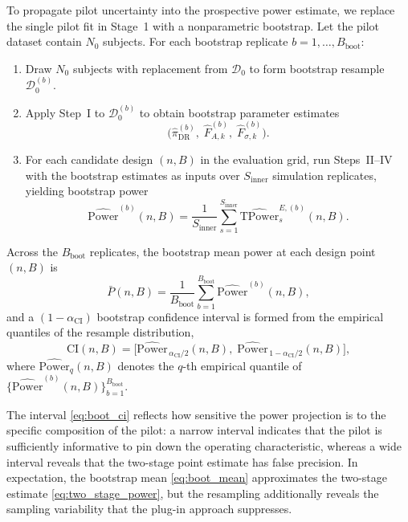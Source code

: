 \documentclass{article}
\begin{document}
To propagate pilot uncertainty into the prospective power estimate, we replace
the single pilot fit in Stage~1 with a nonparametric bootstrap. Let the pilot
dataset contain $N_0$ subjects. For each bootstrap replicate $b=1,\ldots,B_{\mathrm{boot}}$:

\begin{enumerate}
\item Draw $N_0$ subjects with replacement from $\mathcal{D}_0$ to form
bootstrap resample $\mathcal{D}_0^{(b)}$.

\item Apply Step~I to $\mathcal{D}_0^{(b)}$ to obtain bootstrap parameter
estimates
\[
\bigl(\hat{\pi}_{\mathrm{DR}}^{(b)},\;\hat{F}_{A,k}^{(b)},\;\hat{F}_{\sigma,k}^{(b)}\bigr).
\]

\item For each candidate design $(n,B)$ in the evaluation grid, run Steps~II--IV
with the bootstrap estimates as inputs over $S_{\mathrm{inner}}$ simulation
replicates, yielding bootstrap power
\begin{equation}
\widehat{\mathrm{Power}}^{(b)}(n,B)
=
\frac{1}{S_{\mathrm{inner}}}
\sum_{s=1}^{S_{\mathrm{inner}}}
\widehat{\mathrm{TPower}}_s^{E,(b)}(n,B).
\label{eq:boot_power_rep}
\end{equation}
\end{enumerate}

Across the $B_{\mathrm{boot}}$ replicates, the bootstrap mean power at each
design point $(n,B)$ is
\begin{equation}
\bar{P}(n,B)
=
\frac{1}{B_{\mathrm{boot}}}
\sum_{b=1}^{B_{\mathrm{boot}}}
\widehat{\mathrm{Power}}^{(b)}(n,B),
\label{eq:boot_mean}
\end{equation}
and a $(1-\alpha_{\mathrm{CI}})$ bootstrap confidence interval is formed from
the empirical quantiles of the resample distribution,
\begin{equation}
\mathrm{CI}(n,B)
=
\bigl[
\widehat{\mathrm{Power}}_{\,\alpha_{\mathrm{CI}}/2}(n,B),\;
\widehat{\mathrm{Power}}_{\,1-\alpha_{\mathrm{CI}}/2}(n,B)
\bigr],
\label{eq:boot_ci}
\end{equation}
where $\widehat{\mathrm{Power}}_q(n,B)$ denotes the $q$-th empirical quantile
of $\bigl\{\widehat{\mathrm{Power}}^{(b)}(n,B)\bigr\}_{b=1}^{B_{\mathrm{boot}}}$.

The interval \eqref{eq:boot_ci} reflects how sensitive the power projection
is to the specific composition of the pilot: a narrow interval indicates that
the pilot is sufficiently informative to pin down the operating characteristic,
whereas a wide interval reveals that the two-stage point estimate has false
precision. In expectation, the bootstrap mean \eqref{eq:boot_mean} approximates
the two-stage estimate \eqref{eq:two_stage_power}, but the resampling additionally
reveals the sampling variability that the plug-in approach suppresses.
\end{document}
